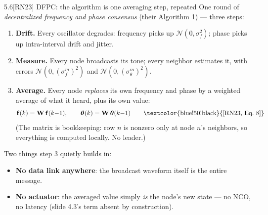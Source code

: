 \documentclass[10pt]{beamer}
\newcommand{\RN}[1]{\textcolor{blue!50!black}{[RN23#1]}}
\newcommand{\srcline}[1]{\par\vfill\noindent{\tiny\textcolor{gray}{Source: #1}}}
\begin{document}
\begin{frame}{5.6\quad \RN{} DFPC: the algorithm is one averaging step, repeated}
\small
One round of \emph{decentralized frequency and phase consensus}
(their Algorithm 1) --- three steps:
\begin{enumerate}
\item \textbf{Drift.} Every oscillator degrades: frequency picks up
$\mathcal N(0,\sigma_f^2)$; phase picks up intra-interval drift and
jitter.
\item \textbf{Measure.} Every node broadcasts its tone; every neighbor
estimates it, with errors $\mathcal N(0,(\sigma^m_f)^2)$ and
$\mathcal N(0,(\sigma^m_\theta)^2)$.
\item \textbf{Average.} Every node \emph{replaces} its own frequency
and phase by a weighted average of what it heard, plus its own value:
\[
\mathbf f(k)=\mathbf W\,\mathbf f(k{-}1),\qquad
\boldsymbol\theta(k)=\mathbf W\,\boldsymbol\theta(k{-}1)
\qquad\text{\RN{, Eq.~8}}
\]
(The matrix is bookkeeping: row $n$ is nonzero only at node $n$'s
neighbors, so everything is computed locally. No leader.)
\end{enumerate}
\vspace{0.5ex}
Two things step 3 quietly builds in:
\begin{itemize}
\item \textbf{No data link anywhere}: the broadcast waveform itself is
the entire message.
\item \textbf{No actuator}: the averaged value simply \emph{is} the
node's new state --- no NCO, no latency (slide 4.3's term absent by
construction).
\end{itemize}
\srcline{[RN23] Algorithm 1, \S III.}
\end{frame}
\end{document}
